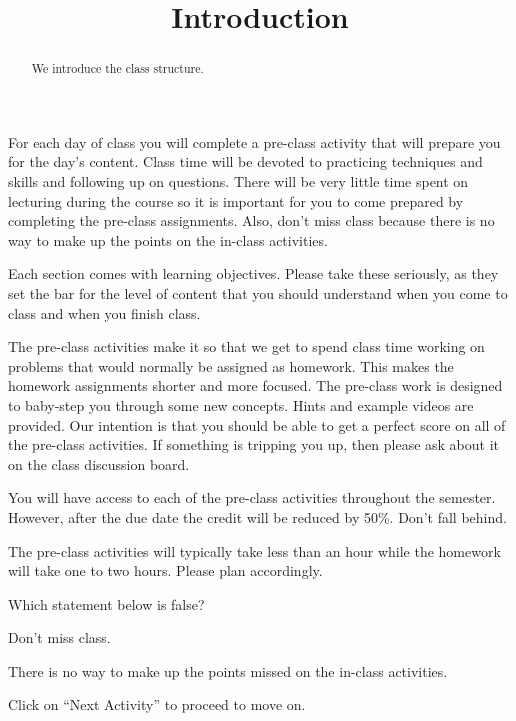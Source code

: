 \documentclass{ximera}
\title{Introduction}
\begin{document}
\begin{abstract}
We introduce the class structure.
\end{abstract}
\maketitle

For each day of class you will complete a pre-class activity that will prepare you for the day's content. Class time will be devoted to practicing techniques and skills and following up on questions. There will be very little time spent on lecturing during the course so it is important for you to come prepared by completing the pre-class assignments. Also, don't miss class because there is no way to make up the points on the in-class activities.

Each section comes with learning objectives. Please take these seriously, as they set the bar for the level of content that you should understand when you come to class and when you finish class. 

The pre-class activities make it so that we get to spend class time working on problems that would normally be assigned as homework. This makes the homework assignments shorter and more focused. The pre-class work is designed to baby-step you through some new concepts. Hints and example videos are provided. Our intention is that you should be able to get a perfect score on all of the pre-class activities. If something is tripping you up, then please ask about it on the class discussion board.

You will have access to each of the pre-class activities throughout the semester. However, after the due date the credit will be reduced by 50\%. Don't fall behind.

The pre-class activities will typically take less than an hour while the homework will take one to two hours. Please plan accordingly.


\begin{question}
Which statement below is false?
    \begin{multipleChoice}
    \end{multipleChoice}
    \begin{hint}
    Don't miss class. 
    \end{hint}
    \begin{hint}
    There is no way to make up the points missed on the in-class activities. 
    \end{hint}
\end{question}

Click on ``Next Activity'' to proceed to move on.
\end{document}
